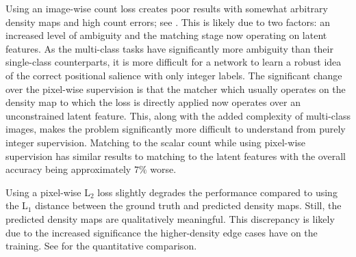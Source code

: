 \documentclass[../thesis.tex]{subfiles}
\begin{document}
Using an image-wise count loss creates poor results with somewhat arbitrary density maps and high count errors; see . 
This is likely due to two factors: an increased level of ambiguity and the matching stage now operating on latent features. 
As the multi-class tasks have significantly more ambiguity than their single-class counterparts, it is more difficult for a network to learn a robust idea of the correct positional salience with only integer labels. 
The significant change over the pixel-wise supervision is that the matcher which usually operates on the density map to which the loss is directly applied now operates over an unconstrained latent feature. This, along with the added complexity of multi-class images, makes the problem significantly more difficult to understand from purely integer supervision. 
Matching to the scalar count while using pixel-wise supervision has similar results to matching to the latent features with the overall accuracy being approximately $7\%$ worse.

Using a pixel-wise L$_2$ loss slightly degrades the performance compared to using the L$_1$ distance between the ground truth and predicted density maps. 
Still, the predicted density maps are qualitatively meaningful. 
This discrepancy is likely due to the increased significance the higher-density edge cases have on the training. See  for the quantitative comparison.




\begin{table}
    \centering
    \resizebox{\textwidth}{!}{%
    
    }
    \caption{The effect of different loss functions during training. Pixel-wise $L_1$ loss produces significantly better results than the pixel-wise $L_2$ loss and the count-wise MAPE.
    }
    \label{table__ABC123__ablation_losses}
\end{table}
\end{document}

